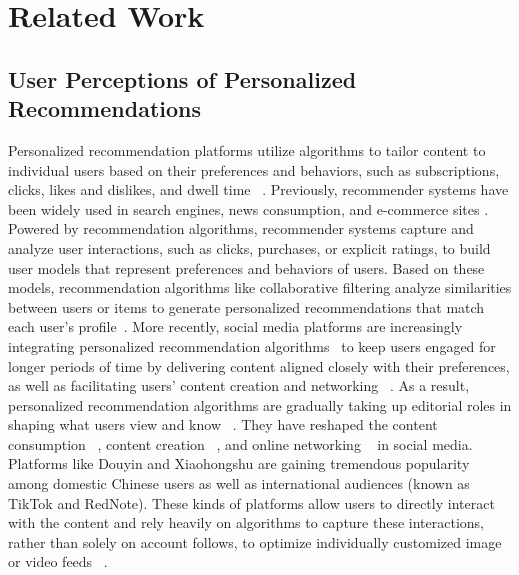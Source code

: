 \section{Related Work}
\subsection{User Perceptions of Personalized Recommendations}

Personalized recommendation platforms utilize algorithms to tailor content to individual users based on their preferences and behaviors, such as subscriptions, clicks, likes and dislikes, and dwell time ~\cite{adomavicius2005toward, setyani2019exploring,yi2014beyond}. Previously, recommender systems have been widely used in search engines, news consumption, and e-commerce sites \cite{schafer1999recommender,lu2015recommender,raza2022news}. Powered by recommendation algorithms, recommender systems capture and analyze user interactions, such as clicks, purchases, or explicit ratings, to build user models that represent preferences and behaviors of users. Based on these models, recommendation algorithms like collaborative filtering analyze similarities between users or items to generate personalized recommendations that match each user's profile~\cite{zanker2009case}. More recently, social media platforms are increasingly integrating personalized recommendation algorithms~\cite{guy2010social} to keep users engaged for longer periods of time by delivering content aligned closely with their preferences, as well as facilitating users’ content creation and networking ~\cite{seaver2019captivating,van2018networks, kang2022ai}. As a result, personalized recommendation algorithms are gradually taking up editorial roles in shaping what users view and know ~\cite{gillespie2014relevance}. They have reshaped the content consumption ~\cite{bucher2016algorithmic}, content creation ~\cite{devito2018people, bucher2018cleavage}, and online networking ~\cite{eriksson2021algorithmic} in social media.
Platforms like Douyin and Xiaohongshu are gaining tremendous popularity among domestic Chinese users as well as international audiences (known as TikTok and RedNote). These kinds of platforms allow users to directly interact with the content and rely heavily on algorithms to capture these interactions, rather than solely on account follows, to optimize individually customized image or video feeds ~\cite{Huang_2021, klug2021trick, Chen2019}. 

